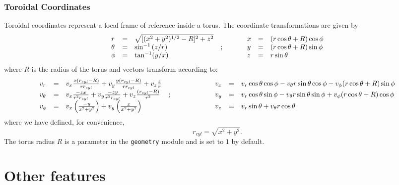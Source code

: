 \documentclass[a4paper,11pt]{article}
\begin{document}
\subsubsection{Toroidal Coordinates}
Toroidal coordinates represent a local frame of reference inside a torus. The coordinate transformations are given by
\begin{displaymath}
\begin{array}{lclp{1cm}lcl}
r & = & \sqrt{[(x^2 + y^2)^{1/2} - R]^{2} + z^{2}}    & & x & = & (r\cos\theta + R) \cos\phi \\
\theta & = & \sin^{-1}{(z/r)}              &; & y & = & (r\cos\theta + R)\sin\phi \\
\phi & = & \tan^{-1}(y/x)             & & z & = & r\sin\theta \\
\end{array}
\end{displaymath}
where $R$ is the radius of the torus and vectors transform according to:
\begin{displaymath}
\begin{array}{lclp{2cm}lcl}
v_r      & = & v_x \frac{x(r_{cyl} - R)}{r r_{cyl}} + v_y \frac{y(r_{cyl} - R)}{r r_{cyl}} + v_{z} \frac{z}{r}  & & v_x & = & v_r \cos\theta\cos\phi- v_\theta r \sin\theta\cos\phi - v_\phi (r\cos\theta + R)\sin\phi \\
v_\theta & = & v_x \frac{-zx}{r^{2} r_{cyl}}  + v_y\frac{-zy}{r^{2} r_{cyl}}  + v_{z}\frac{(r_{cyl} - R)}{r^{2}} &; &v_y & = & v_r \cos\theta\sin\phi - v_\theta r\sin\theta\sin\phi + v_\phi (r \cos\theta + R)\cos\phi \\
v_\phi & = & v_{x} \left(\frac{-y}{x^{2} + y^{2}}\right) + v_{y} \left(\frac{x}{x^{2} + y^{2}}\right) & & v_z & = & v_{r}\sin\theta + v_{\theta} r\cos\theta \\
\end{array}
\end{displaymath}
where we have defined, for convenience,
\begin{equation}
r_{cyl} = \sqrt{x^{2} + y^{2}}. \nonumber
\end{equation}
The torus radius $R$ is a parameter in the \verb+geometry+ module and is set to $1$ by default.

\section{Other features}
\end{document}
